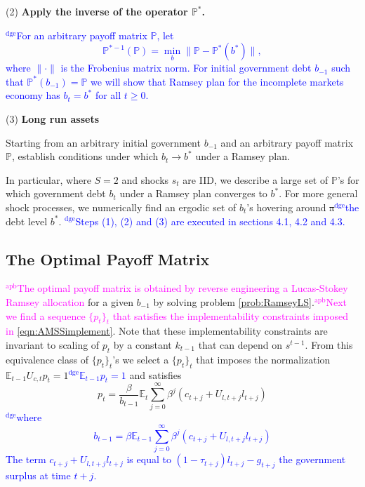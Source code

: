 \documentclass[12pt]{article}
\newcommand{\dge}[1]{\textcolor{blue}{$^{\textrm{dge}}${#1}}}
\newcommand{\apb}[1]{\textcolor{magenta}{$^{\textrm{apb}}${#1}}}
\newcommand{\EE}{\mathbb E}
\begin{document}
\noindent (2) \textbf{Apply the inverse of the operator $\mathbb{P}^*$.}

\dge{For an arbitrary payoff matrix $\mathbb{P}$,  let
\begin{equation}\label{eqn:invPoperator}\mathbb{P}^{* -1}(\mathbb{P}) =\min_{b}\|\mathbb{P}-\mathbb{P}^*(b^*)\|,
\end{equation}where $\|\cdot\|$ is the Frobenius matrix norm.  For initial government debt $b_{-1}$ such that $\mathbb P^*(b_{-1}) = \mathbb P$ we will show that Ramsey plan for the incomplete markets economy has $b_t = b^*$ for all $t \geq 0$.}


\noindent (3) \textbf{Long run assets}

Starting from an arbitrary initial government $b_{-1}$ and an arbitrary payoff matrix $\mathbb{P}$,  establish conditions under  which $b_t \to b^*$ under a Ramsey plan.


In particular, where $S=2$ and shocks $s_t$ are IID,  we describe a large set of  $\mathbb{P}$'s for which government debt $b_t$  under a Ramsey plan converges to $b^*$.  For more general shock processes, we numerically find  an ergodic set of $b_t$'s hovering around \st{a}\dge{the} debt level $b^*$.  \dge{Steps (1), (2) and (3) are executed in sections 4.1, 4.2 and 4.3.}    
\subsection{The Optimal Payoff Matrix}\apb{The optimal payoff matrix is obtained by reverse engineering a Lucas-Stokey Ramsey allocation} for a given $b_{-1}$ by solving  problem \ref{prob:RamseyLS}.\apb{Next we find a sequence $\{p_t\}_t$ that satisfies the implementability constraints imposed in \eqref{eqn:AMSSimplement}}.  Note that these implementability constraints are invariant to scaling of $p_t$ by a constant $k_{t-1} $ that can depend on $s^{t-1}$. From this equivalence class of $\{p_t\}_t$'s we select a  $\{p_t\}_t$ that imposes the normalization  \st{$\mathbb{E}_{t-1}U_{c,t}p_t=1$}\dge{$\mathbb{E}_{t-1}p_t=1$} and satisfies
\begin{equation}\label{eqn:pdisarm} 
p_t =  \frac{\beta}{b_{t-1}}\EE_t\sum_{j=0}^\infty\beta^j\left( c_{t+j}+U_{l,t+j}l_{t+j}\right) 
\end{equation}\dge{where 
\begin{equation}
	b_{t-1} = \beta \EE_{t-1}\sum_{j=0}^\infty \beta^j(c_{t+j}+U_{l,t+j}l_{t+j})
\end{equation}  The term $c_{t+j} +U_{l,t+j}l_{t+j}$ is equal to $(1-\tau_{t+j})l_{t+j} - g_{t+j}$ the government surplus at time $t+j$.}
\end{document}
